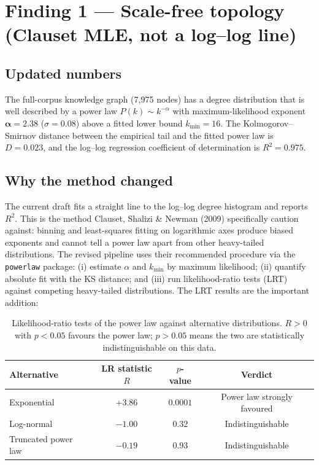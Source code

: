 \documentclass[11pt]{article}
\begin{document}
\clearpage
\section{Finding 1 --- Scale-free topology (Clauset MLE, not a log--log line)}

\subsection*{Updated numbers}
The full-corpus knowledge graph (7{,}975 nodes) has a degree distribution that is well described by a power law $P(k)\sim k^{-\alpha}$ with maximum-likelihood exponent $\boldsymbol{\alpha = 2.38}$ ($\sigma = 0.08$) above a fitted lower bound $k_{\min}=16$. The Kolmogorov--Smirnov distance between the empirical tail and the fitted power law is $D = 0.023$, and the log--log regression coefficient of determination is $R^2 = 0.975$.

\subsection*{Why the method changed}
The current draft fits a straight line to the log--log degree histogram and reports $R^2$. This is the method Clauset, Shalizi \& Newman (2009) specifically caution against: binning and least-squares fitting on logarithmic axes produce biased exponents and cannot tell a power law apart from other heavy-tailed distributions. The revised pipeline uses their recommended procedure via the \texttt{powerlaw} package: (i) estimate $\alpha$ and $k_{\min}$ by maximum likelihood; (ii) quantify absolute fit with the KS distance; and (iii) run likelihood-ratio tests (LRT) against competing heavy-tailed distributions. The LRT results are the important addition:

\begin{table}[h]
\centering
\small
\caption{Likelihood-ratio tests of the power law against alternative distributions. $R>0$ with $p<0.05$ favours the power law; $p>0.05$ means the two are statistically indistinguishable on this data.}
\begin{tabular}{lccc}
\toprule
\textbf{Alternative} & \textbf{LR statistic $R$} & \textbf{$p$-value} & \textbf{Verdict} \\
\midrule
Exponential        & $+3.86$ & $0.0001$ & Power law strongly favoured \\
Log-normal         & $-1.00$ & $0.32$   & Indistinguishable \\
Truncated power law& $-0.19$ & $0.93$   & Indistinguishable \\
\bottomrule
\end{tabular}
\end{table}
\end{document}
